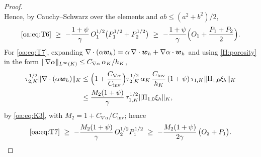 \begin{proof}
\[\]
Hence, by Cauchy--Schwarz over the elements and $ab \le (a^2+b^2)/2$,
\[
  \text{\cref{oa:eq:T6}}
  \ \ge\ -\frac{1+\psi}{\gamma}\, O_1^{1/2}\bigl( P_1^{1/2} + P_2^{1/2} \bigr)
  \ \ge\ -\frac{1+\psi}{\gamma}\Bigl( O_1 + \frac{P_1 + P_2}{2} \Bigr).
\]
For \cref{oa:eq:T7}, expanding
$\nabla\cdot(\alpha\boldsymbol{w}_h) = \alpha\,\nabla\cdot\boldsymbol{w}_h + \nabla\alpha\cdot\boldsymbol{w}_h$ and
using \cref{H:porosity} in the form
$\lVert \nabla\alpha \rVert_{L^\infty(K)} \le C_{\nabla\alpha}\,\alpha_K/h_K$,
\[
\begin{aligned}
  \tau_{2,K}^{1/2}\lVert \nabla\cdot(\alpha\boldsymbol{w}_h) \rVert_{K}
  &\le \Bigl(1 + \frac{C_{\nabla\alpha}}{C_{\mathrm{inv}}}\Bigr)
  \tau_{2,K}^{1/2}\,\alpha_K\,\frac{C_{\mathrm{inv}}}{h_K}\,
  (1+\psi)\,\tau_{1,K}\lVert \Pi_{1,0}\xi_h \rVert_{K} \\
  &\le \frac{M_2(1+\psi)}{\gamma}\,\tau_{1,K}^{1/2}\lVert \Pi_{1,0}\xi_h \rVert_{K},
\end{aligned}
\]
by \cref{oa:eq:K3}, with $M_2 = 1 + C_{\nabla\alpha}/C_{\mathrm{inv}}$; hence
\[
  \text{\cref{oa:eq:T7}}
  \ \ge\ -\frac{M_2(1+\psi)}{\gamma}\, O_2^{1/2} P_1^{1/2}
  \ \ge\ -\frac{M_2(1+\psi)}{2\gamma}\,\bigl( O_2 + P_1 \bigr).
\]


\end{proof}
